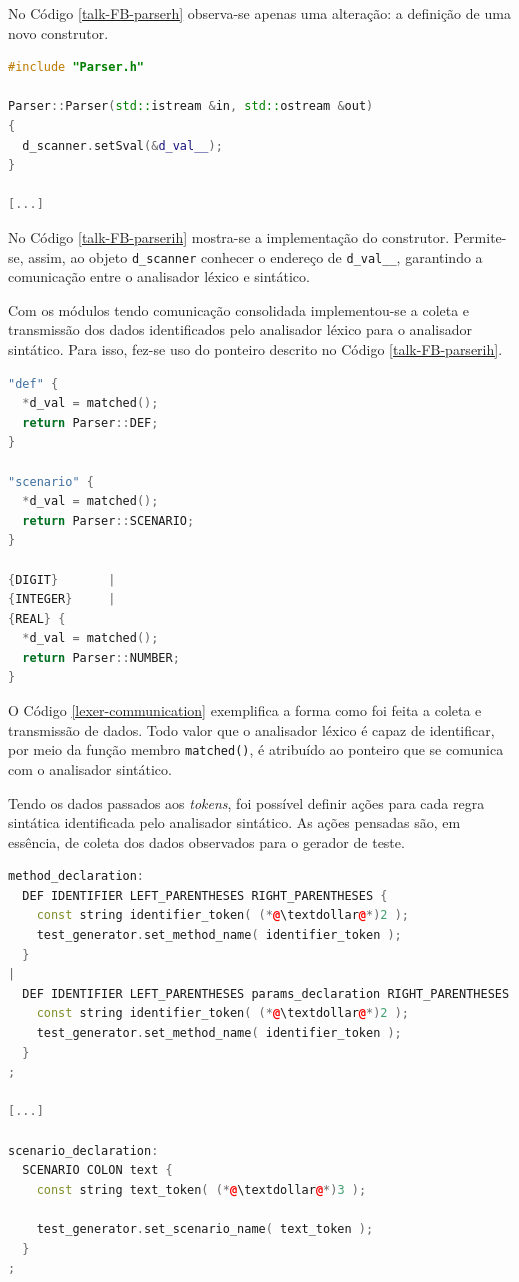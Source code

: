 \par
\indent No Código \ref{talk-FB-parserh} observa-se apenas uma alteração: a
definição de uma novo construtor.
\par
\begin{lstlisting}[language=C++, label=talk-FB-parserih, caption=Alterações no Parser.ih para comunicação entre Analisador Léxico e Sintático]
#include "Parser.h"

Parser::Parser(std::istream &in, std::ostream &out)
{
  d_scanner.setSval(&d_val__);
}

[...]
\end{lstlisting}
\par
\indent No Código \ref{talk-FB-parserih} mostra-se a implementação do construtor.
Permite-se, assim, ao objeto \lstinline|d_scanner| conhecer o endereço
de \lstinline|d_val__|, garantindo a comunicação entre o analisador léxico e
sintático.
\par
\indent Com os módulos tendo comunicação consolidada implementou-se a coleta e
transmissão dos dados identificados pelo analisador léxico para o analisador
sintático. Para isso, fez-se uso do ponteiro descrito no
Código \ref{talk-FB-parserih}.
\par
\begin{lstlisting}[language=C++, label=lexer-communication, caption=Estabelecendo coleta e transmissão de dados entre analisador léxico e sintático]
"def" {
  *d_val = matched();
  return Parser::DEF;
}

"scenario" {
  *d_val = matched();
  return Parser::SCENARIO;
}

{DIGIT}       |
{INTEGER}     |
{REAL} {
  *d_val = matched();
  return Parser::NUMBER;
}
\end{lstlisting}
\par
\indent O Código \ref{lexer-communication} exemplifica a forma como foi feita a
coleta e transmissão de dados. Todo valor que o analisador léxico é capaz de
identificar, por meio da função membro \lstinline|matched()|, é atribuído ao
ponteiro que se comunica com o analisador sintático.
\par
\indent Tendo os dados passados aos \textit{tokens}, foi possível definir ações
para cada regra sintática identificada pelo analisador sintático. As ações
pensadas são, em essência, de coleta dos dados observados para o gerador de teste.
\begin{lstlisting}[language=C++, label=grammar-action, caption=Definindo ações para as regras do analisador sintático]
method_declaration:
  DEF IDENTIFIER LEFT_PARENTHESES RIGHT_PARENTHESES {
    const string identifier_token( (*@\textdollar@*)2 );
    test_generator.set_method_name( identifier_token );
  }
|
  DEF IDENTIFIER LEFT_PARENTHESES params_declaration RIGHT_PARENTHESES {
    const string identifier_token( (*@\textdollar@*)2 );
    test_generator.set_method_name( identifier_token );
  }
;

[...]

scenario_declaration:
  SCENARIO COLON text {
    const string text_token( (*@\textdollar@*)3 );

    test_generator.set_scenario_name( text_token );
  }
;
\end{lstlisting}
